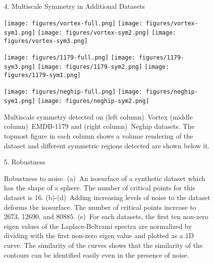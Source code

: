 \documentclass[review,journal]{vgtc}         %
\begin{document}
\begin{figure*}
\centering
{\sffamily\large{4. Multiscale Symmetry in Additional Datasets\\}}
\vspace{0.5cm}
\centering
\begin{minipage}{0.33\textwidth}
	\centering
	\subfigure
	{
		\texttt{[image: figures/vortex-full.png]}
	}
	\subfigure
	{
		\texttt{[image: figures/vortex-sym1.png]}
	}
	\subfigure
	{
		\texttt{[image: figures/vortex-sym2.png]}
	}
	\subfigure
	{
		\texttt{[image: figures/vortex-sym3.png]}
	}
\end{minipage}
\begin{minipage}{0.33\textwidth}
	\centering
	\subfigure
	{
		\texttt{[image: figures/1179-full.png]}
	}
	\subfigure
	{
		\texttt{[image: figures/1179-sym3.png]}
	}
	\subfigure
	{
		\texttt{[image: figures/1179-sym2.png]}
	}
	\subfigure
	{
		\texttt{[image: figures/1179-sym1.png]}
	}
\end{minipage}
\begin{minipage}{0.33\textwidth}
	\subfigure
	{
		\texttt{[image: figures/neghip-full.png]}
	}
	\subfigure
	{
		\texttt{[image: figures/neghip-sym1.png]}
	}
	\subfigure
	{
		\texttt{[image: figures/neghip-sym2.png]}
	}
\end{minipage}
\caption{\label{addres}Multiscale symmetry detected on (left column)~Vortex (middle column)~EMDB-1179 and (right column)~Neghip datasets.
	The topmost figure in each column shows a volume rendering of the dataset and different symmetric regions detected
are shown below it.}
\end{figure*}
\begin{figure*}
	\centering
	{\sffamily\large{5. Robustness\\}}
	\centering
	\caption{Robustness to noise. (a)~An isosurface of a synthetic dataset 
		which has the shape of a sphere. The number of critical points for this dataset
		is 16. (b)-(d)~Adding increasing levels of noise to the dataset deforms the
		isosurface. The number of critical points increase to 2673, 12690, and 80885.  
		(e)~For each datasets, the first ten non-zero eigen values of the Laplace-Beltrami spectra 
		are normalized by dividing with the first non-zero eigen value and plotted as a 1D curve. 
		The similarity of the curves shows that the similarity of the contours can be identified easily even in the presence
		of noise. }
\end{figure*}
\end{document}
